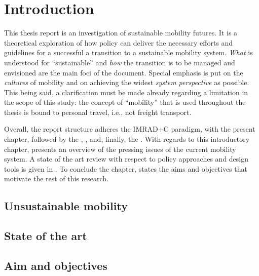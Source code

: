 \chapter{Introduction}
\label{c:introduction}

This thesis report is an investigation of sustainable mobility futures. It is a theoretical exploration of how policy can deliver the necessary efforts and guidelines for a successful a transition to a sustainable mobility system. \emph{What} is understood for ``sustainable'' and \emph{how} the transition is to be managed and envisioned are the main foci of the document. Special emphasis is put on the \emph{cultures} of mobility and on achieving the widest \emph{system perspective} as possible. This being said, a clarification must be made already regarding a limitation in the scope of this study: the concept of ``mobility'' that is used throughout the thesis is bound to personal travel, i.e., not freight transport.

Overall, the report structure adheres the IMRAD+C paradigm, with the present  chapter, followed by the , ,  and, finally, the . With regards to this introductory chapter,  presents an overview of the pressing issues of the current mobility system. A state of the art review with respect to policy approaches and design tools is given in . To conclude the chapter,  states the aims and objectives that motivate the rest of this research.

\section{Unsustainable mobility}
\label{s:intro:unsustainable-mobility}


\section{State of the art}
\label{s:intro:state-of-art}


\section{Aim and objectives}
\label{s:intro:aim-objectives}
